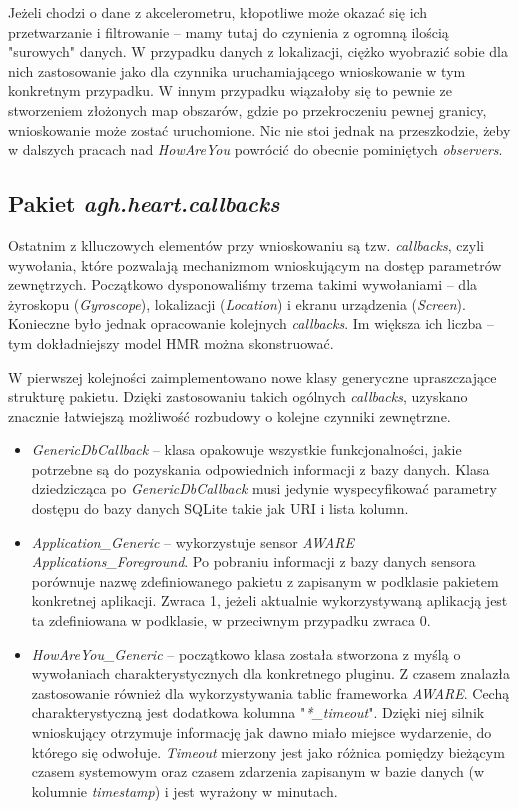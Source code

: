 Jeżeli chodzi o dane z akcelerometru, kłopotliwe może okazać się ich przetwarzanie i filtrowanie -- mamy tutaj do czynienia z ogromną ilością "surowych" danych. W przypadku danych z lokalizacji, ciężko wyobrazić sobie dla nich zastosowanie jako dla czynnika uruchamiającego wnioskowanie w tym konkretnym przypadku. W innym przypadku wiązałoby się to pewnie ze stworzeniem złożonych map obszarów, gdzie po przekroczeniu pewnej granicy, wnioskowanie może zostać uruchomione. Nic nie stoi jednak na przeszkodzie, żeby w dalszych pracach nad \textit{HowAreYou} powrócić do obecnie pominiętych \textit{observers}.


\subsection{Pakiet \textit{agh.heart.callbacks}}

Ostatnim z klluczowych elementów przy wnioskowaniu są tzw. \textit{callbacks}, czyli wywołania, które pozwalają mechanizmom wnioskującym na dostęp parametrów zewnętrzych. Początkowo dysponowaliśmy trzema takimi wywołaniami -- dla żyroskopu (\textit{Gyroscope}), lokalizacji (\textit{Location}) i ekranu urządzenia (\textit{Screen}). Konieczne było jednak opracowanie kolejnych \textit{callbacks}. Im większa ich liczba -- tym dokładniejszy model HMR można skonstruować. 

W pierwszej kolejności zaimplementowano nowe klasy generyczne upraszczające strukturę pakietu. Dzięki zastosowaniu takich ogólnych \textit{callbacks}, uzyskano znacznie łatwiejszą możliwość rozbudowy o kolejne czynniki zewnętrzne.
\begin{itemize}
	\item \textit{GenericDbCallback} -- klasa opakowuje wszystkie funkcjonalności, jakie potrzebne są do pozyskania odpowiednich informacji z bazy danych. Klasa dziedzicząca po \textit{GenericDbCallback} musi jedynie wyspecyfikować parametry dostępu do bazy danych SQLite takie jak URI i lista kolumn.
	
	\item \textit{Application\_Generic} -- wykorzystuje sensor \textit{AWARE} \textit{Applications\_Foreground}. Po pobraniu informacji z bazy danych sensora porównuje nazwę zdefiniowanego pakietu z zapisanym w podklasie pakietem konkretnej aplikacji. Zwraca 1, jeżeli aktualnie wykorzystywaną aplikacją jest ta zdefiniowana w podklasie, w przeciwnym przypadku zwraca 0.
	
	\item \textit{HowAreYou\_Generic} -- początkowo klasa została stworzona z myślą o wywołaniach charakterystycznych dla konkretnego pluginu. Z czasem znalazła zastosowanie również dla wykorzystywania tablic frameworka \textit{AWARE}. Cechą charakterystyczną jest dodatkowa kolumna "\textit{*\_timeout}". Dzięki niej silnik wnioskujący otrzymuje informację jak dawno miało miejsce wydarzenie, do którego się odwołuje. \textit{Timeout} mierzony jest jako różnica pomiędzy bieżącym czasem systemowym oraz czasem zdarzenia zapisanym w bazie danych (w kolumnie \textit{timestamp}) i jest wyrażony w minutach.
\end{itemize}

